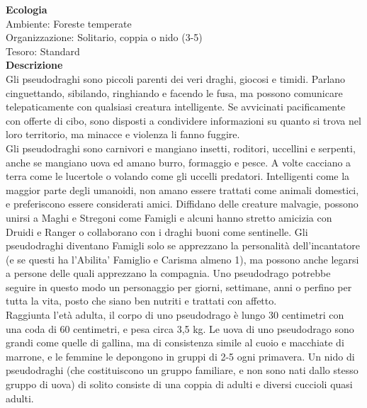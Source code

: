 \begin{multicols}{2}
\textbf{Ecologia}\\
Ambiente: Foreste temperate\\
Organizzazione: Solitario, coppia o nido (3-5)\\
Tesoro: Standard\\
\textbf{Descrizione}\\
Gli pseudodraghi sono piccoli parenti dei veri draghi, giocosi e timidi. Parlano cinguettando, sibilando, ringhiando e facendo le fusa, ma possono comunicare telepaticamente con qualsiasi creatura intelligente. Se avvicinati pacificamente con offerte di cibo, sono disposti a condividere informazioni su quanto si trova nel loro territorio, ma minacce e violenza li fanno fuggire.\\

Gli pseudodraghi sono carnivori e mangiano insetti, roditori, uccellini e serpenti, anche se mangiano uova ed amano burro, formaggio e pesce. A volte cacciano a terra come le lucertole o volando come gli uccelli predatori. Intelligenti come la maggior parte degli umanoidi, non amano essere trattati come animali domestici, e preferiscono essere considerati amici. Diffidano delle creature malvagie, possono unirsi a Maghi e Stregoni come Famigli e alcuni hanno stretto amicizia con Druidi e Ranger o collaborano con i draghi buoni come sentinelle. Gli pseudodraghi diventano Famigli solo se apprezzano la personalità dell'incantatore (e se questi ha l'Abilita' Famiglio e Carisma almeno 1), ma possono anche legarsi a persone delle quali apprezzano la compagnia. Uno pseudodrago potrebbe seguire in questo modo un personaggio per giorni, settimane, anni o perfino per tutta la vita, posto che siano ben nutriti e trattati con affetto.\\

Raggiunta l'età adulta, il corpo di uno pseudodrago è lungo 30 centimetri con una coda di 60 centimetri, e pesa circa 3,5 kg. Le uova di uno pseudodrago sono grandi come quelle di gallina, ma di consistenza simile al cuoio e macchiate di marrone, e le femmine le depongono in gruppi di 2-5 ogni primavera. Un nido di pseudodraghi (che costituiscono un gruppo familiare, e non sono nati dallo stesso gruppo di uova) di solito consiste di una coppia di adulti e diversi cuccioli quasi adulti.\\



\end{multicols}
